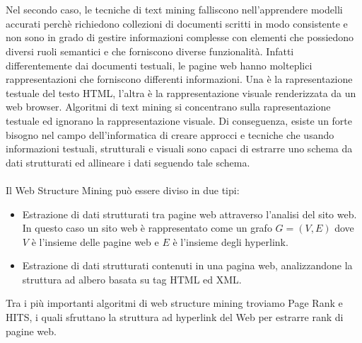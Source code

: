 \\\\
Nel secondo caso, le tecniche di text mining falliscono nell’apprendere modelli accurati perchè richiedono collezioni di documenti scritti in modo consistente e non sono in grado di gestire informazioni complesse con elementi che possiedono diversi ruoli semantici e che forniscono diverse funzionalità. Infatti differentemente dai documenti testuali, le pagine web hanno molteplici rappresentazioni che forniscono differenti informazioni. Una è la rapresentazione testuale del testo HTML, l’altra è la rappresentazione visuale renderizzata da un web browser. Algoritmi di text mining si concentrano sulla rapresentazione testuale ed ignorano la rappresentazione visuale. Di conseguenza, esiste un forte bisogno nel campo dell’informatica di creare approcci e tecniche che usando informazioni testuali, strutturali e visuali sono capaci di estrarre uno schema da dati strutturati ed allineare i dati seguendo tale schema.
\\\\
Il Web Structure Mining può essere diviso in due tipi:
\begin{itemize}
\item Estrazione di dati strutturati tra pagine web attraverso l'analisi del sito web. In questo caso un sito web è rappresentato come un grafo $G = (V, E)$ dove $V$ è l'insieme delle pagine web e $E$ è l'insieme degli hyperlink.
\item Estrazione di dati strutturati contenuti in una pagina web, analizzandone la struttura ad albero basata su tag HTML ed XML.
\end{itemize}
Tra i più importanti algoritmi di web structure mining troviamo Page Rank\cite{} e HITS\cite{}, i quali sfruttano la struttura ad hyperlink del Web per estrarre rank di pagine web.

